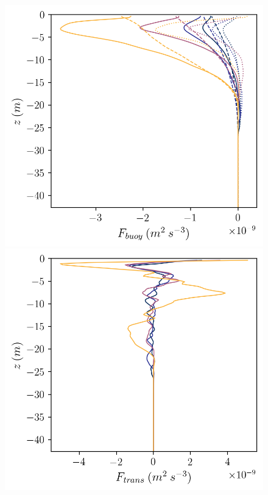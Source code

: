 \documentclass[draft,jgrga]{agutexSI2019}
\begin{document}
\begin{figure}
\begin{minipage}{0.5\textwidth}
    \end{minipage}
    \newline
    \begin{minipage}{0.5\textwidth}
        \includegraphics[trim={0 0 0 0},clip,width=\textwidth]{Figures/Fbuoy_cmp_dT_43h_tav13h_z_profile.png}
    \end{minipage}%
    \begin{minipage}{0.5\textwidth}
        \includegraphics[trim={0 0 0 0},clip,width=\textwidth]{Figures/Ftrans_cmp_dT_43h_tav13h_z_profile.png}

\end{minipage}
\end{figure}
\end{document}
